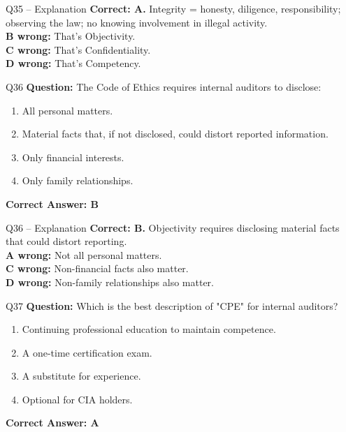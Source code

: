\documentclass[aspectratio=169,10pt]{beamer}
\begin{document}
	\begin{frame}[t]{Q35 -- Explanation}
		\small
		\textbf{Correct: A.} Integrity = honesty, diligence, responsibility; observing the law; no knowing involvement in illegal activity. \\[4pt]
		\textbf{B wrong:} That's Objectivity. \\[2pt]
		\textbf{C wrong:} That's Confidentiality. \\[2pt]
		\textbf{D wrong:} That's Competency.
	\end{frame}
	
	\begin{frame}[t]{Q36}
		\small
		\textbf{Question:} The Code of Ethics requires internal auditors to disclose:
		\begin{enumerate}[label=\Alph*.,itemsep=1pt,topsep=2pt]
			\item All personal matters.
			\item Material facts that, if not disclosed, could distort reported information.
			\item Only financial interests.
			\item Only family relationships.
		\end{enumerate}
		\vspace{4pt}
		\textbf{Correct Answer: B}
	\end{frame}
	
	\begin{frame}[t]{Q36 -- Explanation}
		\small
		\textbf{Correct: B.} Objectivity requires disclosing material facts that could distort reporting. \\[4pt]
		\textbf{A wrong:} Not all personal matters. \\[2pt]
		\textbf{C wrong:} Non-financial facts also matter. \\[2pt]
		\textbf{D wrong:} Non-family relationships also matter.
	\end{frame}
	
	\begin{frame}[t]{Q37}
		\small
		\textbf{Question:} Which is the best description of "CPE" for internal auditors?
		\begin{enumerate}[label=\Alph*.,itemsep=1pt,topsep=2pt]
			\item Continuing professional education to maintain competence.
			\item A one-time certification exam.
			\item A substitute for experience.
			\item Optional for CIA holders.
		\end{enumerate}
		\vspace{4pt}
		\textbf{Correct Answer: A}
	\end{frame}
	
\end{document}
